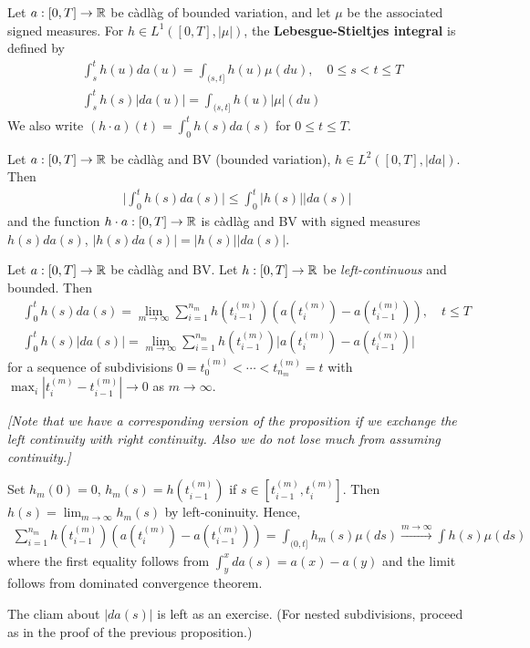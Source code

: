\documentclass[12pt,a4paper]{article}
\newenvironment{proof}
{\begin{changemargin}{0.5cm}{0.5cm} 
	}%
	{\end{changemargin}
}
\newenvironment{p}
{\begin{proof} 
	}%
	{\end{proof}
}
\begin{document}
 Let $a:[0,T]\rightarrow \mathbb{R}$ be c\`adl\`ag of bounded variation, and let $\mu$ be the associated signed measures. For $h\in L^1([0,T], |\mu|)$, the \textbf{Lebesgue-Stieltjes integral} is defined by
\begin{align*}
& \int_s^t h(u) da(u) = \int_{(s,t]} h(u) \mu(du), \quad 0\leq s<t\leq T\\
& \int_s^t h(s) |da(u)| = \int_{(s,t]} h(u) |\mu| (du)
\end{align*}
We also write $(h\cdot a)(t) = \int_0^t h(s) da(s)$ for $0\leq t\leq T$.
\s

\fact Let $a: [0,T] \rightarrow \mathbb{R}$ be c\`adl\`ag and BV (bounded variation), $h\in L^2([0,T], |da|)$. Then
\begin{align*}
\Big| \int_0^t h(s) da(s )\Big| \leq \int_0^t |h(s)| |da(s)|
\end{align*}
and the function $h\cdot a:[0,T]\rightarrow \mathbb{R}$ is c\`adl\`ag and BV with signed measures $h(s)da(s)$, $|h(s)da(s)| = |h(s)||da(s)|$.
\s

\prop Let $a: [0,T] \rightarrow \mathbb{R}$ be c\`adl\`ag and BV. Let $h:[0,T] \rightarrow \mathbb{R}$ be \emph{left-continuous} and bounded. Then
\begin{align*}
& \int_0^t h(s) da(s) = \lim_{m\rightarrow \infty} \sum_{i=1}^{n_m} h(t_{i-1}^{(m)})(a(t_i^{(m)}) - a(t_{i-1}^{(m)})), \quad t\leq T \\
& \int_0^t h(s) |da(s)| = \lim_{m\rightarrow \infty} \sum_{i=1}^{n_m} h(t_{i-1}^{(m)})\Big|a(t_i^{(m)}) - a(t_{i-1}^{(m)})\Big|
\end{align*}
for a sequence of subdivisions $0=t_0^{(m)} < \cdots < t_{n_m}^{(m)}=t$ with $\max_i |t_i^{(m)} - t_{i-1}^{(m)}| \rightarrow 0$ as $m\rightarrow \infty$.

\quad \emph{[Note that we have a corresponding version of the proposition if we exchange the left continuity with right continuity. Also we do not lose much from assuming continuity.]}
\begin{p}
\pf Set $h_m(0)=0$, $h_m(s) = h(t_{i-1}^{(m)})$ if $s\in [t_{i-1}^{(m)}, t_i^{(m)}]$. Then $h(s) = \lim_{m\rightarrow \infty} h_m(s)$ by left-coninuity. Hence, 
\begin{align*}
\sum_{i=1}^{n_m} h(t_{i-1}^{(m)})(a(t_i^{(m)}) - a(t_{i-1}^{(m)})) = \int_{(0,t]} h_m(s) \mu(ds) \xrightarrow{m\rightarrow \infty} \int h(s) \mu(ds)
\end{align*}
where the first equality follows from $\int_y^x da(s) = a(x)-a(y)$ and the limit follows from dominated convergence theorem.

\quad The cliam about $|da(s)|$ is left as an exercise. (For nested subdivisions, proceed as in the proof of the previous proposition.)
\end{p}
\s
\end{document}

